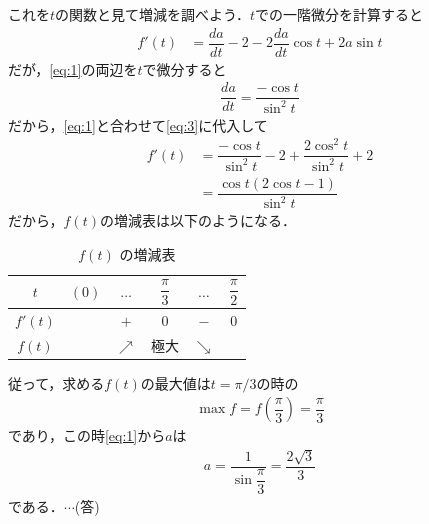 \documentclass[../../main.tex]{subfiles}
\begin{document}
これを$t$の関数と見て増減を調べよう．$t$での一階微分を計算すると
\begin{align}
  f'(t)
  &= \dfrac{da}{dt} - 2 - 2\dfrac{da}{dt}\cos t + 2a\sin t \label{eq:3}
\end{align}
だが，\cref{eq:1}の両辺を$t$で微分すると
\begin{align}
  \dfrac{da}{dt} = \dfrac{-\cos t}{\sin^2 t} \label{eq:4}
\end{align}
だから，\cref{eq:1}と合わせて\cref{eq:3}に代入して
\begin{align}
  f'(t)
  &= \dfrac{-\cos t}{\sin^2 t} - 2 + \dfrac{2\cos^2 t}{\sin^2 t} + 2 \\
  &= \dfrac{\cos t\left(2\cos t - 1\right)}{\sin^2 t}
\end{align}
だから，$f(t)$の増減表は以下のようになる．

\begin{table}[htb]
  \centering
  \caption{$f(t)$ の増減表}
  \label{tab:g_increase_decrease}
  \renewcommand{\arraystretch}{1.4}
  \begin{tabular}{c|c|c|c|c|c}
    $t$ & $(0)$ & $\dots$ & $\dfrac{\pi}{3}$ & $\dots$ & $\dfrac{\pi}{2}$ \\ \hline
    $f'(t)$ & & $+$ & $0$ & $-$ & $0$ \\ \hline
    $f(t)$ & & $\nearrow$ & 極大 & $\searrow$ &
  \end{tabular}
\end{table}

従って，求める$f(t)$の最大値は$t=\pi/3$の時の
\begin{align}
  \max f = f\left(\dfrac{\pi}{3}\right) = \dfrac{\pi}{3}
\end{align}
であり，この時\cref{eq:1}から$a$は
\begin{align}
  a=\dfrac{1}{\sin \dfrac{\pi}{3}} = \dfrac{2\sqrt{3}}{3}
\end{align}
である．$\cdots$(答)
\newpage
\end{document}

